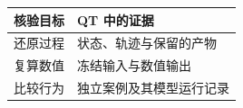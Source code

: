 \begin{tabular}{@{}P{4.0cm}P{8.5cm}@{}}
\toprule
\textbf{核验目标} & \textbf{QT 中的证据} \\
\midrule
还原过程 & 状态、轨迹与保留的产物 \\
复算数值 & 冻结输入与数值输出 \\
比较行为 & 独立案例及其模型运行记录 \\
\bottomrule
\end{tabular}
